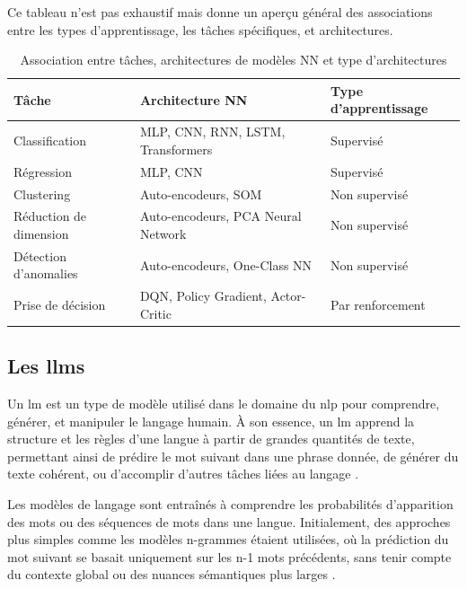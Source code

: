 Ce tableau n'est pas exhaustif mais donne un aperçu général des associations entre les types d'apprentissage, les tâches spécifiques, et architectures.

\begin{table}[h]
\centering
\begin{tabular}{|l|l|l|}
\hline
\textbf{Tâche}                   & \textbf{Architecture NN}                     & \textbf{Type d'apprentissage}   \\ \hline
Classification          & MLP, CNN, RNN, LSTM, Transformers   & Supervisé                \\ \hline
Régression              & MLP, CNN                              & Supervisé                \\ \hline
Clustering              & Auto-encodeurs, SOM                  & Non supervisé            \\ \hline
Réduction de dimension  & Auto-encodeurs, PCA Neural Network   & Non supervisé            \\ \hline
Détection d'anomalies   & Auto-encodeurs, One-Class NN         & Non supervisé            \\ \hline
Prise de décision       & DQN, Policy Gradient, Actor-Critic   & Par renforcement         \\ \hline
\end{tabular}
\caption{Association entre tâches, architectures de modèles NN et type d'architectures}
\label{tab:my-table}
\end{table}

\subsection{Les \acfp{llm}}
\label{ch:1:section:llm}

Un \ac{lm}  est un type de modèle utilisé dans le domaine du \ac{nlp} pour comprendre, générer, et manipuler le langage humain. À son essence, un \ac{lm} apprend la structure et les règles d'une langue à partir de grandes quantités de texte, permettant ainsi de prédire le mot suivant dans une phrase donnée, de générer du texte cohérent, ou d'accomplir d'autres tâches liées au langage \cite{Jurafsky2009}. 

Les modèles de langage sont entraînés à comprendre les probabilités d'apparition des mots ou des séquences de mots dans une langue. Initialement, des approches plus simples comme les modèles n-grammes étaient utilisées, où la prédiction du mot suivant se basait uniquement sur les n-1 mots précédents, sans tenir compte du contexte global ou des nuances sémantiques plus larges \cite{Jurafsky2009, Agarwal}.


